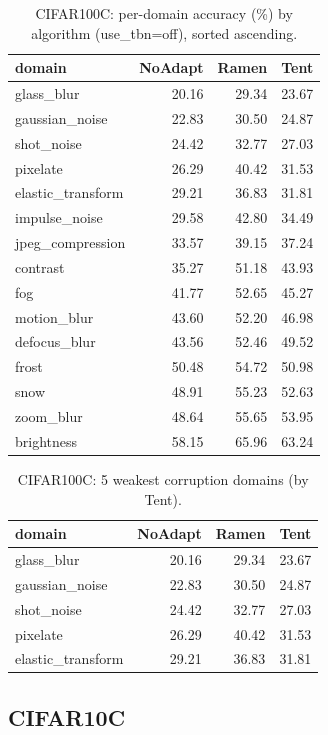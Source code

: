 \documentclass[11pt]{article}
\begin{document}
\begin{table}[H]
\centering
\small
\begin{tabular}{lrrr}
\toprule
domain & NoAdapt & Ramen & Tent \\
\midrule
glass\_blur & 20.16 & 29.34 & 23.67 \\
gaussian\_noise & 22.83 & 30.50 & 24.87 \\
shot\_noise & 24.42 & 32.77 & 27.03 \\
pixelate & 26.29 & 40.42 & 31.53 \\
elastic\_transform & 29.21 & 36.83 & 31.81 \\
impulse\_noise & 29.58 & 42.80 & 34.49 \\
jpeg\_compression & 33.57 & 39.15 & 37.24 \\
contrast & 35.27 & 51.18 & 43.93 \\
fog & 41.77 & 52.65 & 45.27 \\
motion\_blur & 43.60 & 52.20 & 46.98 \\
defocus\_blur & 43.56 & 52.46 & 49.52 \\
frost & 50.48 & 54.72 & 50.98 \\
snow & 48.91 & 55.23 & 52.63 \\
zoom\_blur & 48.64 & 55.65 & 53.95 \\
brightness & 58.15 & 65.96 & 63.24 \\
\bottomrule
\end{tabular}

\caption{CIFAR100C: per-domain accuracy (\%) by algorithm (use\_tbn=off), sorted ascending.}
\end{table}

\begin{table}[H]
\centering
\small
\begin{tabular}{lrrr}
\toprule
domain & NoAdapt & Ramen & Tent \\
\midrule
glass\_blur & 20.16 & 29.34 & 23.67 \\
gaussian\_noise & 22.83 & 30.50 & 24.87 \\
shot\_noise & 24.42 & 32.77 & 27.03 \\
pixelate & 26.29 & 40.42 & 31.53 \\
elastic\_transform & 29.21 & 36.83 & 31.81 \\
\bottomrule
\end{tabular}

\caption{CIFAR100C: 5 weakest corruption domains (by Tent).}
\end{table}

\subsection*{CIFAR10C}
\end{document}
